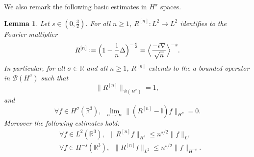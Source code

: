 \documentclass[12pt,a4paper]{amsart}
\newtheorem{lemma}[theorem]{Lemma}
\numberwithin{equation}{section}
\newcommand{\twoasts}{{2^*_s}}
\begin{document}
	
	
	
	We also remark the following basic estimates in $H^\sigma$ spaces.
	
	\begin{lemma}
		Let $s\in(0,\frac32)$. For all $n\geq1$, $R^{[n]}:L^2\to L^2$ identifies to the Fourier multiplier 
		\begin{equation}\label{eq:R(n)L^2}
			R^{[n]} \vcentcolon= \Big(1-\frac{1}{n} \Delta \Big)^{-\frac{s}{2}} = \Big\langle \frac{ - i \nabla}{\sqrt{n}} \Big\rangle^{-s} .
		\end{equation}
		In particular, for all $\sigma\in\mathbb{R}$ and all $n\geq1$, $R^{[n]}$ extends to the a bounded operator in $\mathcal{B}(H^\sigma)$ such that 
		\begin{equation}\label{eq:bound_R(n)_Hsigma}
			\|R^{[n]}\|_{\mathcal{B}(H^\sigma)}=1,
		\end{equation}
		and
		\begin{equation}\label{lim:reg_strong_conv_Hs}
			\forall f \in H^\sigma(\mathbb{R}^3) ,\;\ \lim_{n \rightarrow \infty} \| (R^{[n]} - \mathbb{I}) f \|_{H^\sigma} = 0 .
		\end{equation}
		Moreover the following estimates hold:
		\begin{align}
			&\forall f \in L^2(\mathbb{R}^3), \;\ \| R^{[n]} f \|_{H^{s}} \leq n^{s/2} \| f \|_{L^2} \;\ \label{est:Hs_reg}\\
			&\forall f \in H^{-s}(\mathbb{R}^3), \;\ \| R^{[n]} f \|_{L^2} \leq n^{s/2} \| f \|_{H^{-s}}  .\label{est:Hs_reg2}
		\end{align}
	\end{lemma}
\end{document}
